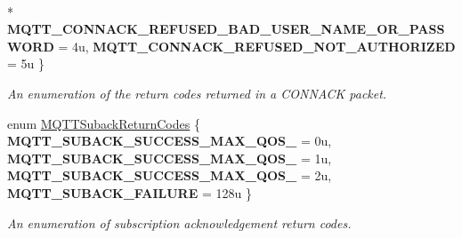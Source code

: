 \begin{DoxyCompactItemize}
\\*
{\bfseries M\+Q\+T\+T\+\_\+\+C\+O\+N\+N\+A\+C\+K\+\_\+\+R\+E\+F\+U\+S\+E\+D\+\_\+\+B\+A\+D\+\_\+\+U\+S\+E\+R\+\_\+\+N\+A\+M\+E\+\_\+\+O\+R\+\_\+\+P\+A\+S\+S\+W\+O\+RD} = 4u, 
{\bfseries M\+Q\+T\+T\+\_\+\+C\+O\+N\+N\+A\+C\+K\+\_\+\+R\+E\+F\+U\+S\+E\+D\+\_\+\+N\+O\+T\+\_\+\+A\+U\+T\+H\+O\+R\+I\+Z\+ED} = 5u
 \}\begin{DoxyCompactList}\small\item\em An enumeration of the return codes returned in a C\+O\+N\+N\+A\+CK packet. \end{DoxyCompactList}
\item 
enum \hyperlink{group__unpackers_ga2d626b05e589a148ce2e9e97f41302ae}{M\+Q\+T\+T\+Suback\+Return\+Codes} \{ {\bfseries M\+Q\+T\+T\+\_\+\+S\+U\+B\+A\+C\+K\+\_\+\+S\+U\+C\+C\+E\+S\+S\+\_\+\+M\+A\+X\+\_\+\+Q\+O\+S\+\_} = 0u, 
{\bfseries M\+Q\+T\+T\+\_\+\+S\+U\+B\+A\+C\+K\+\_\+\+S\+U\+C\+C\+E\+S\+S\+\_\+\+M\+A\+X\+\_\+\+Q\+O\+S\+\_} = 1u, 
{\bfseries M\+Q\+T\+T\+\_\+\+S\+U\+B\+A\+C\+K\+\_\+\+S\+U\+C\+C\+E\+S\+S\+\_\+\+M\+A\+X\+\_\+\+Q\+O\+S\+\_} = 2u, 
{\bfseries M\+Q\+T\+T\+\_\+\+S\+U\+B\+A\+C\+K\+\_\+\+F\+A\+I\+L\+U\+RE} = 128u
 \}\begin{DoxyCompactList}\small\item\em An enumeration of subscription acknowledgement return codes. \end{DoxyCompactList}
\end{DoxyCompactItemize}
